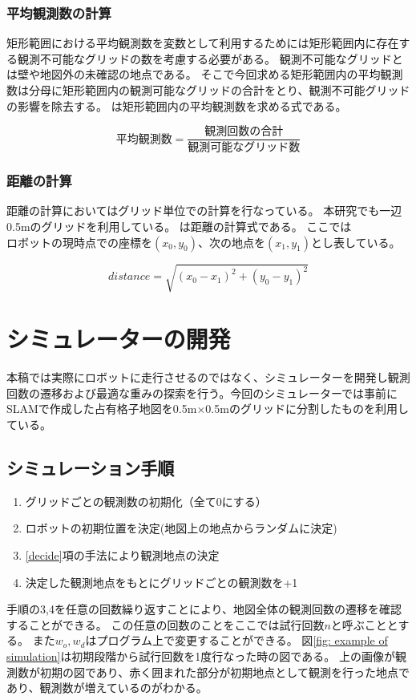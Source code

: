 \documentclass{jsarticle}
\begin{document}
\subsubsection{平均観測数の計算}
矩形範囲における平均観測数を変数として利用するためには矩形範囲内に存在する観測不可能なグリッドの数を考慮する必要がある。
観測不可能なグリッドとは壁や地図外の未確認の地点である。
そこで今回求める矩形範囲内の平均観測数は分母に矩形範囲内の観測可能なグリッドの合計をとり、観測不可能グリッドの影響を除去する。
は矩形範囲内の平均観測数を求める式である。

\begin{equation}
  平均観測数 = \frac{観測回数の合計}{観測可能なグリッド数}
	\label{eqn: observation}
\end{equation}

\subsubsection{距離の計算}
距離の計算においてはグリッド単位での計算を行なっている。
本研究でも一辺0.5mのグリッドを利用している。
は距離の計算式である。
ここでは$ロボットの現時点での座標を(x_0, y_0)、次の地点を(x_1,y_1)$とし表している。


\begin{equation}
  distance = \sqrt{(x_0-x_1)^2 + (y_0-y_1)^2}
	\label{eqn: distance}
\end{equation}



\section{シミュレーターの開発}
\label{simulation}
本稿では実際にロボットに走行させるのではなく、シミュレーターを開発し観測回数の遷移および最適な重みの探索を行う。今回のシミュレーターでは事前にSLAMで作成した占有格子地図を0.5m$\times$0.5mのグリッドに分割したものを利用している。

\subsection{シミュレーション手順}
\label{process-simulation}
\begin{enumerate}
  \item グリッドごとの観測数の初期化（全て0にする）
  \item ロボットの初期位置を決定(地図上の地点からランダムに決定)
  \item \ref{decide}項の手法により観測地点の決定
  \item 決定した観測地点をもとにグリッドごとの観測数を+1
\end{enumerate}
手順の3,4を任意の回数繰り返すことにより、地図全体の観測回数の遷移を確認することができる。
この任意の回数のことをここでは試行回数$n$と呼ぶこととする。
また$w_o,w_d$はプログラム上で変更することができる。
図\ref{fig: example of simulation}は初期段階から試行回数を1度行なった時の図である。
上の画像が観測数が初期の図であり、赤く囲まれた部分が初期地点として観測を行った地点であり、観測数が増えているのがわかる。
\end{document}
